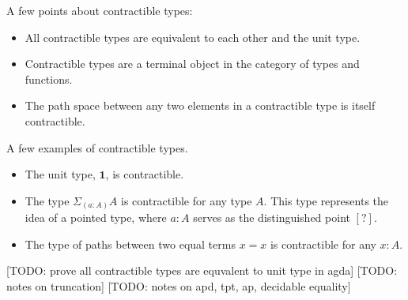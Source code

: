 \documentclass{article}
\begin{document}
\begin{remark}[Properties]
  A few points about contractible types:
  \begin{itemize}
    \item All contractible types are equivalent to each other and the unit type.

    \item Contractible types are a terminal object in the category of types and functions.

    \item The path space between any two elements in a contractible type is itself contractible.
  \end{itemize}
\end{remark}
\begin{remark}[Examples]
   A few examples of contractible types.
  \begin{itemize}
    \item The unit type, $\mathbf{1}$, is contractible.

    \item The type $\Sigma_{(a : A)} A$ is contractible for any type $A$. This type represents the idea of a pointed type, where $a : A$ serves as the distinguished point $\mathbf{[?]}$.

    \item The type of paths between two equal terms $x = x$ is contractible for any $x : A$.

  \end{itemize}
\end{remark}

[TODO: prove all contractible types are equvalent to unit type in agda]
[TODO: notes on truncation]
[TODO: notes on apd, tpt, ap, decidable equality]
\end{document}
